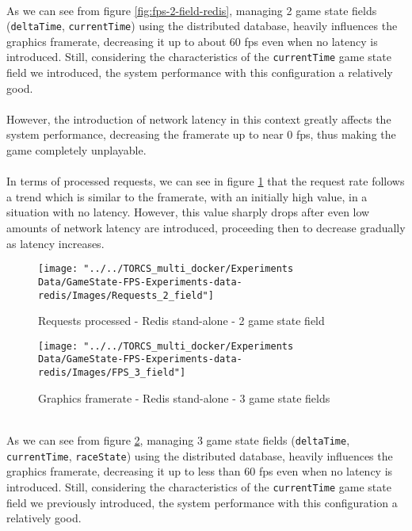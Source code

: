 \\ As we can see from figure \ref{fig:fps-2-field-redis}, managing 2 game state fields (\texttt{deltaTime}, \texttt{currentTime}) using the distributed database, heavily influences the graphics framerate, decreasing it up to about 60 fps even when no latency is introduced. Still, considering the characteristics of the \texttt{currentTime} game state field we introduced, the system performance with this configuration a relatively good. \\ \\
However, the introduction of network latency in this context greatly affects the system performance, decreasing the framerate up to near 0 fps, thus making the game completely unplayable. \\ \\
In terms of processed requests, we can see in figure \ref{fig:requests-2-field-redis} that the request rate follows a trend which is similar to the framerate, with an initially high value, in a situation with no latency. However, this value sharply drops after even low amounts of network latency are introduced, proceeding then to decrease gradually as latency increases. \\
\begin{figure}[h!]
	\centering
	\texttt{[image: "../../TORCS\_multi\_docker/Experiments Data/GameState-FPS-Experiments-data-redis/Images/Requests\_2\_field"]}
	\caption[Requests processed - Redis stand-alone - 2 game state field]{Requests processed - Redis stand-alone - 2 game state field}
	\label{fig:requests-2-field-redis}
\end{figure}
\begin{figure}[h!]
	\centering
	\texttt{[image: "../../TORCS\_multi\_docker/Experiments Data/GameState-FPS-Experiments-data-redis/Images/FPS\_3\_field"]}
	\caption[Graphics framerate - Redis stand-alone - 3 game state fields]{Graphics framerate - Redis stand-alone - 3 game state fields}
	\label{fig:fps-3-field-redis}
\end{figure}
\\ As we can see from figure \ref{fig:fps-3-field-redis}, managing 3 game state fields (\texttt{deltaTime}, \texttt{currentTime}, \texttt{raceState}) using the distributed database, heavily influences the graphics framerate, decreasing it up to less than 60 fps even when no latency is introduced. Still, considering the characteristics of the \texttt{currentTime} game state field we previously introduced, the system performance with this configuration a relatively good. \\ \\
